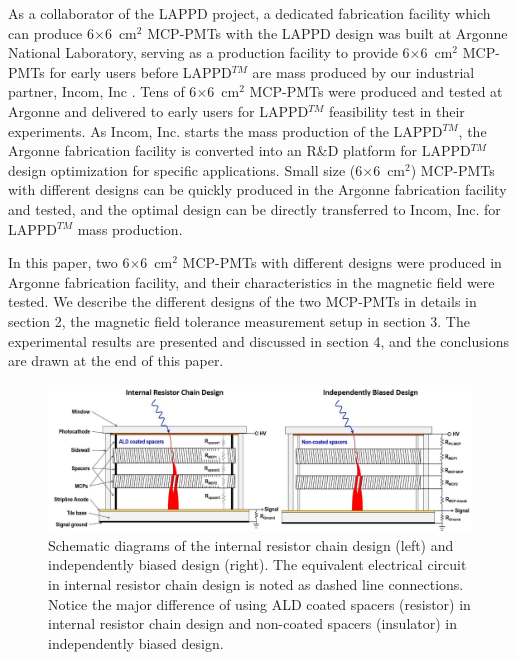 ﻿\documentclass[preprint,5p]{elsarticle}
\begin{document}
As a collaborator of the LAPPD project, a dedicated fabrication facility 
\cite{15} which can produce 6$\times$6~cm$^2$ MCP-PMTs with the LAPPD design was 
built at Argonne National Laboratory, serving as a production facility to 
provide 6$\times$6~cm$^2$ MCP-PMTs for early users before LAPPD$^{TM}$ are mass 
produced by our industrial partner, Incom, Inc \cite{16}. Tens of 
6$\times$6~cm$^2$ MCP-PMTs were produced and tested at Argonne and delivered to early 
users for LAPPD$^{TM}$ feasibility test in their experiments. As Incom, Inc.  
starts the mass production of the LAPPD$^{TM}$, the Argonne fabrication 
facility is converted into an R\&D platform for LAPPD$^{TM}$ design 
optimization for specific applications. Small size (6$\times$6~cm$^2$) MCP-PMTs 
with different designs can be quickly produced in the Argonne fabrication 
facility and tested, and the optimal design can be directly transferred to 
Incom, Inc. for LAPPD$^{TM}$ mass production. 

In this paper, two 6$\times$6~cm$^2$ MCP-PMTs with different designs were 
produced in Argonne fabrication facility, and their characteristics in the 
magnetic field were tested. We describe the different designs of the two 
MCP-PMTs in details in section 2, the magnetic field tolerance measurement 
setup in section 3. The experimental results are presented and discussed in 
section 4, and the conclusions are drawn at the end of this paper.



\begin{figure}[tbp]
\centering \includegraphics[scale=1.1]{fig/Figure1.jpg}
\caption{Schematic diagrams of the internal resistor chain design (left) and 
   independently biased design (right). The equivalent electrical circuit in 
   internal resistor chain design is noted as dashed line connections. Notice 
   the major difference of using ALD coated spacers (resistor) in internal 
   resistor chain design and non-coated spacers (insulator) in independently 
   biased design.} \label{fig:design}
\end{figure}
\end{document}
